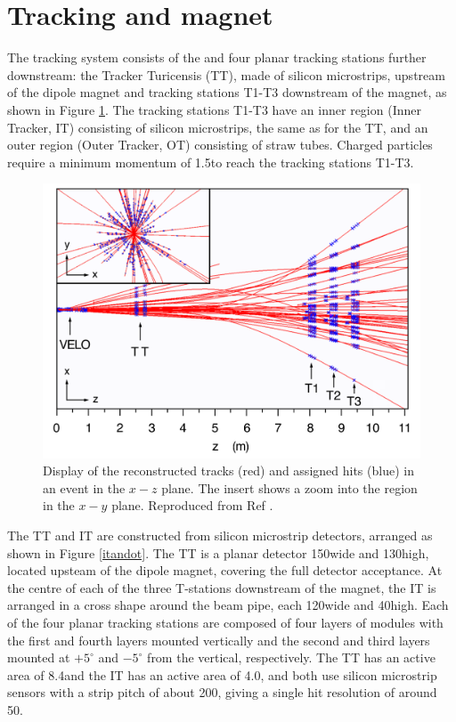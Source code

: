 \section{Tracking and magnet}
\label{sec:detector:tracking}

The \lhcb tracking system consists of the \velo and four planar tracking stations further downstream: the Tracker Turicensis (TT), made of silicon microstrips, upstream of the dipole magnet and tracking stations T1-T3 downstream of the magnet, as shown in Figure \ref{tracking}. The tracking stations T1-T3 have an inner region (Inner Tracker, IT) consisting of silicon microstrips, the same as for the TT, and an outer region (Outer Tracker, OT) consisting of straw tubes. Charged particles require a minimum momentum of 1.5\gevc to reach the tracking stations T1-T3.

\begin{figure}
\centering
\includegraphics[width=0.7\linewidth]{figures/detector/tracking.pdf}
\caption{Display of the reconstructed tracks (red) and assigned hits (blue) in an event in the $x-z$ plane. The insert shows a zoom into the \velo region in the $x-y$ plane. Reproduced from Ref \cite{LHCb-DP-2014-002}.}
\label{tracking}
\end{figure}

The TT and IT are constructed from silicon microstrip detectors, arranged as shown in Figure \ref{itandot}. The TT is a planar detector 150\cm wide and 130\cm high, located upsteam of the dipole magnet, covering the full detector acceptance. At the centre of each of the three T-stations downstream of the magnet, the IT is arranged in a cross shape around the beam pipe, each 120\cm wide and 40\cm high. Each of the four planar tracking stations are composed of four layers of modules with the first and fourth layers mounted vertically and the second and third layers mounted at $+5^{\circ}$ and $-5^{\circ}$ from the vertical, respectively. The TT has an active area of 8.4\ma and the IT has an active area of 4.0\ma, and both use silicon microstrip sensors with a strip pitch of about
200\mum, giving a single hit resolution of around 50\mum.

